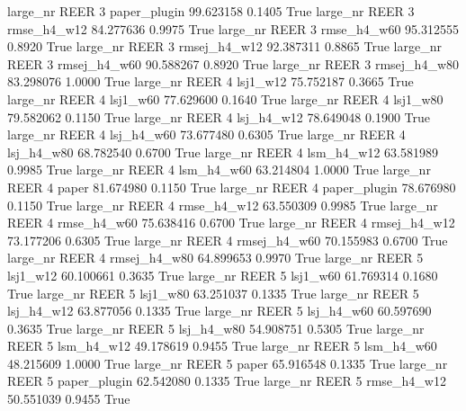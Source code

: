   large_nr     REER                 3 paper_plugin   99.623158      0.1405    True
  large_nr     REER                 3  rmse_h4_w12   84.277636      0.9975    True
  large_nr     REER                 3  rmse_h4_w60   95.312555      0.8920    True
  large_nr     REER                 3 rmsej_h4_w12   92.387311      0.8865    True
  large_nr     REER                 3 rmsej_h4_w60   90.588267      0.8920    True
  large_nr     REER                 3 rmsej_h4_w80   83.298076      1.0000    True
  large_nr     REER                 4     lsj1_w12   75.752187      0.3665    True
  large_nr     REER                 4     lsj1_w60   77.629600      0.1640    True
  large_nr     REER                 4     lsj1_w80   79.582062      0.1150    True
  large_nr     REER                 4   lsj_h4_w12   78.649048      0.1900    True
  large_nr     REER                 4   lsj_h4_w60   73.677480      0.6305    True
  large_nr     REER                 4   lsj_h4_w80   68.782540      0.6700    True
  large_nr     REER                 4   lsm_h4_w12   63.581989      0.9985    True
  large_nr     REER                 4   lsm_h4_w60   63.214804      1.0000    True
  large_nr     REER                 4        paper   81.674980      0.1150    True
  large_nr     REER                 4 paper_plugin   78.676980      0.1150    True
  large_nr     REER                 4  rmse_h4_w12   63.550309      0.9985    True
  large_nr     REER                 4  rmse_h4_w60   75.638416      0.6700    True
  large_nr     REER                 4 rmsej_h4_w12   73.177206      0.6305    True
  large_nr     REER                 4 rmsej_h4_w60   70.155983      0.6700    True
  large_nr     REER                 4 rmsej_h4_w80   64.899653      0.9970    True
  large_nr     REER                 5     lsj1_w12   60.100661      0.3635    True
  large_nr     REER                 5     lsj1_w60   61.769314      0.1680    True
  large_nr     REER                 5     lsj1_w80   63.251037      0.1335    True
  large_nr     REER                 5   lsj_h4_w12   63.877056      0.1335    True
  large_nr     REER                 5   lsj_h4_w60   60.597690      0.3635    True
  large_nr     REER                 5   lsj_h4_w80   54.908751      0.5305    True
  large_nr     REER                 5   lsm_h4_w12   49.178619      0.9455    True
  large_nr     REER                 5   lsm_h4_w60   48.215609      1.0000    True
  large_nr     REER                 5        paper   65.916548      0.1335    True
  large_nr     REER                 5 paper_plugin   62.542080      0.1335    True
  large_nr     REER                 5  rmse_h4_w12   50.551039      0.9455    True

